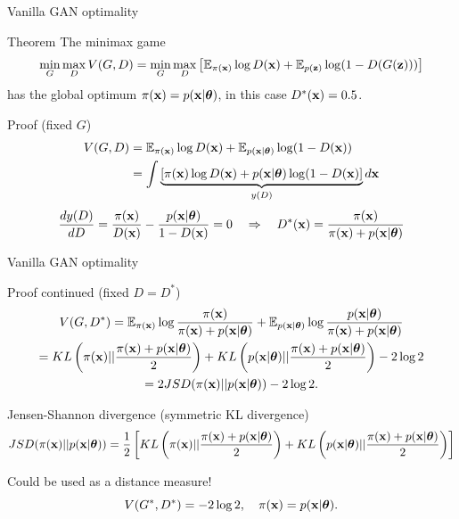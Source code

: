 \begin{frame}{Vanilla GAN optimality}
	\begin{block}{Theorem}
	The minimax game 
		\vspace{-0.1cm}
		\[
			\min_{G} \max_D V(G, D) = \min_{G} \max_D \left[ \mathbb{E}_{\pi(\mathbf{x})} \log D(\mathbf{x}) + \mathbb{E}_{p(\mathbf{z})} \log (1 - D(G(\mathbf{z}))) \right]
		\]
	has the global optimum $\pi(\mathbf{x}) = p(\mathbf{x} | \boldsymbol{\theta})$, in this case $D^*(\mathbf{x}) = 0.5$.
	\end{block}
	\begin{block}{Proof (fixed $G$)}
		\vspace{-0.5cm}
		\begin{align*}
			V(G, D) &= \mathbb{E}_{\pi(\mathbf{x})} \log D(\mathbf{x}) + \mathbb{E}_{p(\mathbf{x} | \boldsymbol{\theta})} \log (1 - D(\mathbf{x})) \\
			&= \int \underbrace{\left[ \pi(\mathbf{x}) \log D(\mathbf{x}) + p(\mathbf{x} | \boldsymbol{\theta})\log (1 - D(\mathbf{x}) \right]}_{y(D)} d \mathbf{x}
		\end{align*}
		\vspace{-0.2cm}
		\[
			\frac{d y(D)}{d D} = \frac{\pi(\mathbf{x})}{D(\mathbf{x})} - \frac{p(\mathbf{x} | \boldsymbol{\theta})}{1 - D(\mathbf{x})} = 0 \quad \Rightarrow \quad D^*(\mathbf{x}) = \frac{\pi(\mathbf{x})}{\pi(\mathbf{x}) + p(\mathbf{x} | \boldsymbol{\theta})}
		\]
	\end{block}
\end{frame}
\begin{frame}{Vanilla GAN optimality}
	\begin{block}{Proof continued (fixed $D = D^*$)}
		\vspace{-0.5cm}
		\begin{multline*}
			V(G, D^*) = \mathbb{E}_{\pi(\mathbf{x})} \log \frac{\pi(\mathbf{x})}{\pi(\mathbf{x}) + p(\mathbf{x} | \boldsymbol{\theta})} + \mathbb{E}_{p(\mathbf{x} | \boldsymbol{\theta})} \log \frac{p(\mathbf{x} | \boldsymbol{\theta})}{\pi(\mathbf{x}) + p(\mathbf{x} | \boldsymbol{\theta})} \\
		 = KL \left(\pi(\mathbf{x}) || \frac{\pi(\mathbf{x}) + p(\mathbf{x} | \boldsymbol{\theta})}{2}\right) + KL \left(p(\mathbf{x} | \boldsymbol{\theta}) || \frac{\pi(\mathbf{x}) + p(\mathbf{x} | \boldsymbol{\theta})}{2}\right) - 2\log 2 \\
		 = 2JSD(\pi(\mathbf{x}) || p(\mathbf{x} | \boldsymbol{\theta})) - 2\log 2.
		\end{multline*}
	\end{block}
	\vspace{-0.3cm}
	\begin{block}{Jensen-Shannon divergence (symmetric KL divergence)}
		\vspace{-0.2cm}
		\footnotesize
		\[
			JSD(\pi(\mathbf{x}) || p(\mathbf{x} | \boldsymbol{\theta})) = \frac{1}{2} \left[KL \left(\pi(\mathbf{x}) || \frac{\pi(\mathbf{x}) + p(\mathbf{x} | \boldsymbol{\theta})}{2}\right) + KL \left(p(\mathbf{x} | \boldsymbol{\theta}) || \frac{\pi(\mathbf{x}) + p(\mathbf{x} | \boldsymbol{\theta})}{2}\right) \right]
		\]
	\end{block}
	Could be used as a distance measure!
	\[
		V(G^*, D^*) = -2\log 2, \quad \pi(\mathbf{x}) = p(\mathbf{x} | \boldsymbol{\theta}).
	\]
	
\end{frame}
